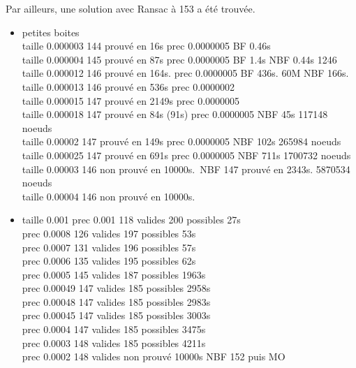 \documentclass{article}
\begin{document}
Par ailleurs, une solution avec Ransac \`a 153 a \'et\'e trouv\'ee.
\begin {itemize}
\item {petites boites}\\
        taille  0.000003  144  prouv\'e en 16s prec 0.0000005       BF  0.46s \\
        taille  0.000004  145   prouv\'e en 87s  prec 0.0000005        BF 1.4s    NBF 0.44s 1246 \\
        taille 0.000012   146   prouv\'e en 164s.  prec 0.0000005     BF  436s. 60M   NBF 166s. \\
        taille 0.000013   146   prouv\'e en 536s   prec 0.0000002\\
        taille 0.000015   147   prouv\'e en 2149s  prec 0.0000005 \\
        taille 0.000018   147   prouv\'e en 84s (91s)   prec 0.0000005    NBF 45s  117148 noeuds \\
        taille 0.00002    147   prouv\'e en 149s   prec 0.0000005         NBF 102s 265984 noeuds  \\
        taille 0.000025   147   prouv\'e en 691s   prec 0.0000005         NBF 711s 1700732 noeuds \\
        taille 0.00003    146   non prouv\'e en 10000s.\  NBF 147  prouv\'e en 2343s.  5870534 noeuds \\
        taille 0.00004    146   non prouv\'e en 10000s.

\item {taille  0.001   }
           prec 0.001  118 valides      200 possibles    27s  \\
           prec 0.0008 126 valides      197 possibles    53s  \\
           prec 0.0007 131 valides      196 possibles    57s  \\
           prec 0.0006 135 valides      195 possibles    62s  \\
           prec 0.0005 145 valides      187 possibles   1963s  \\
           prec 0.00049 147 valides     185 possibles   2958s  \\
           prec 0.00048 147 valides     185 possibles   2983s  \\
           prec 0.00045 147 valides     185 possibles   3003s  \\
           prec 0.0004  147 valides     185 possibles   3475s  \\
           prec 0.0003  148 valides     185 possibles   4211s  \\
           prec 0.0002  148 valides   non prouv\'e       10000s      NBF 152 puis MO \\



\end{itemize}
\end{document}
